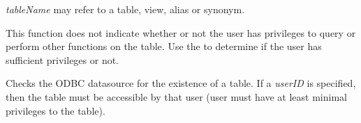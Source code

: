
{\it tableName} may refer to a table, view, alias or synonym.

This function does not indicate whether or not the user has privileges to query or perform other functions on the table.  Use the  to determine if the user has sufficient privileges or not.



\label{wxdbtableprivileges}


Checks the ODBC datasource for the existence of a table.  If a {\it userID}
is specified, then the table must be accessible by that user (user must have
at least minimal privileges to the table).


